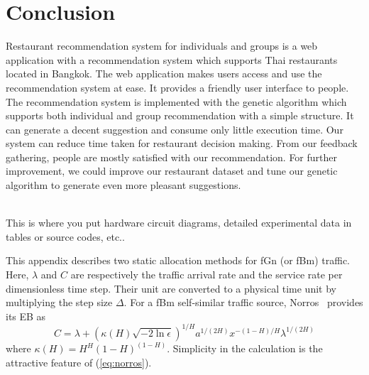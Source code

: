 \documentclass[12pt,oneside,openright,a4paper]{cpe-english-project}
\begin{document}
\section{Conclusion}

Restaurant recommendation system for individuals and groups is a web application with a recommendation system which supports Thai restaurants located in Bangkok. The web application makes users access and use the recommendation system at ease. It provides a friendly user interface to people. The recommendation system is implemented with the genetic algorithm which supports both individual and group recommendation with a simple structure. It can generate a decent suggestion and consume only little execution time. Our system can reduce time taken for restaurant decision making. From our feedback gathering, people are mostly satisfied with our recommendation. For further improvement, we could improve our restaurant dataset and tune our genetic algorithm to generate even more pleasant suggestions.






 \\

This is where you put hardware circuit diagrams, detailed experimental data in tables or source codes, etc.. \\ \bigskip



This appendix describes two static allocation methods for fGn (or fBm)
traffic. Here, $\lambda$ and $C$ are respectively the traffic arrival
rate and the service rate per dimensionless time step. Their unit are
converted to a physical time unit by multiplying the step size
$\Delta$. For a fBm self-similar traffic source,
Norros~\cite{norros95} provides its EB as
\begin{equation}\label{eq:norros}
  C = \lambda + (\kappa(H)\sqrt{-2\ln\epsilon})^{1/H}a^{1/(2H)}x^{-(1-H)/H}\lambda^{1/(2H)}
\end{equation}
where $\kappa(H) = H^H(1-H)^{(1-H)}$. Simplicity in the calculation is
the attractive feature of (\ref{eq:norros}).
\end{document}
